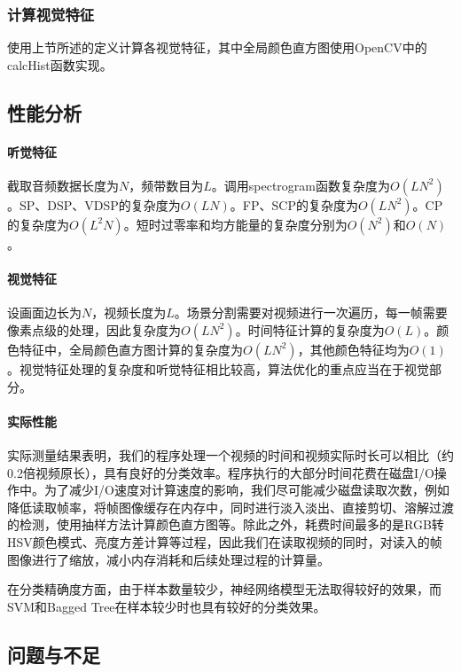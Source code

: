 \documentclass{article}
\begin{document}
\begin{multicols}{2}
            \subsubsection{计算视觉特征}
                使用上节所述的定义计算各视觉特征，其中全局颜色直方图使用OpenCV中的calcHist函数实现。

        \subsection{性能分析}
            \paragraph{听觉特征}
            截取音频数据长度为$N$，频带数目为$L$。调用spectrogram函数复杂度为$O(LN^2)$。SP、DSP、VDSP的复杂度为$O(LN)$。FP、SCP的复杂度为$O(LN^2)$。CP的复杂度为$O(L^2N)$。短时过零率和均方能量的复杂度分别为$O(N^2)$和$O(N)$。

            \paragraph{视觉特征}
            设画面边长为$N$，视频长度为$L$。场景分割需要对视频进行一次遍历，每一帧需要像素点级的处理，因此复杂度为$O(LN^2)$。时间特征计算的复杂度为$O(L)$。颜色特征中，全局颜色直方图计算的复杂度为$O(LN^2)$，其他颜色特征均为$O(1)$。视觉特征处理的复杂度和听觉特征相比较高，算法优化的重点应当在于视觉部分。

            \paragraph{实际性能}
            实际测量结果表明，我们的程序处理一个视频的时间和视频实际时长可以相比（约0.2倍视频原长），具有良好的分类效率。程序执行的大部分时间花费在磁盘I/O操作中。为了减少I/O速度对计算速度的影响，我们尽可能减少磁盘读取次数，例如降低读取帧率，将帧图像缓存在内存中，同时进行淡入淡出、直接剪切、溶解过渡的检测，使用抽样方法计算颜色直方图等。除此之外，耗费时间最多的是RGB转HSV颜色模式、亮度方差计算等过程，因此我们在读取视频的同时，对读入的帧图像进行了缩放，减小内存消耗和后续处理过程的计算量。

            在分类精确度方面，由于样本数量较少，神经网络模型无法取得较好的效果，而SVM和Bagged Tree在样本较少时也具有较好的分类效果。

        \subsection{问题与不足}

\end{multicols}
\end{document}
